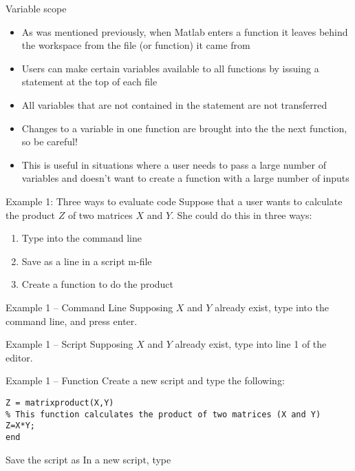\documentclass[english,xcolor=dvipsnames]{beamer}
\begin{document}
\begin{frame}{Variable scope}
\begin{itemize}
	\item As was mentioned previously, when Matlab enters a function it leaves behind the workspace from the file (or function) it came from
	\item Users can make certain variables available to all functions by issuing a  statement at the top of each file
	\item All variables that are not contained in the  statement are not transferred
	\item Changes to a  variable in one function are brought into the the next function, so be careful!
	\item This is useful in situations where a user needs to pass a large number of variables and doesn't want to create a function with a large number of inputs
\end{itemize}
\end{frame}

\begin{frame}{Example 1: Three ways to evaluate code}
Suppose that a user wants to calculate the product $Z$ of two matrices $X$ and $Y$. She could do this in three ways:
\begin{enumerate}
	\item Type into the command line
	\item Save as a line in a script m-file
	\item Create a function to do the product
\end{enumerate}
\end{frame}

\begin{frame}{Example 1 -- Command Line}
Supposing $X$ and $Y$ already exist, type  into the command line, and press enter.
\end{frame}

\begin{frame}{Example 1 -- Script}
Supposing $X$ and $Y$ already exist, type  into line 1 of the editor.
\end{frame}

\begin{frame}[fragile]{Example 1 -- Function}
Create a new script and type the following:
\begin{lstlisting}
Z = matrixproduct(X,Y)
% This function calculates the product of two matrices (X and Y)
Z=X*Y;
end
\end{lstlisting}
Save the script as 
\vspace{1cm}
In a new script, type 
\end{frame}
\end{document}
